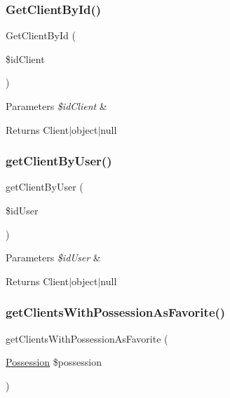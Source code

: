 \subsubsection{\texorpdfstring{GetClientById()}{GetClientById()}}
{\footnotesize\ttfamily Get\+Client\+By\+Id (\begin{DoxyParamCaption}\item[{}]{\$id\+Client }\end{DoxyParamCaption})}


\begin{DoxyParams}{Parameters}
{\em \$id\+Client} & \\
\hline
\end{DoxyParams}
\begin{DoxyReturn}{Returns}
Client$\vert$object$\vert$null 
\end{DoxyReturn}
\mbox{\label{class_app_1_1_b_l_1_1_client_manager_a8fd0a8928e20a9c8b64c3f76746ead77}} 
\subsubsection{\texorpdfstring{getClientByUser()}{getClientByUser()}}
{\footnotesize\ttfamily get\+Client\+By\+User (\begin{DoxyParamCaption}\item[{}]{\$id\+User }\end{DoxyParamCaption})}


\begin{DoxyParams}{Parameters}
{\em \$id\+User} & \\
\hline
\end{DoxyParams}
\begin{DoxyReturn}{Returns}
Client$\vert$object$\vert$null 
\end{DoxyReturn}
\mbox{\label{class_app_1_1_b_l_1_1_client_manager_a04d532b0b319982ca22034751805bd54}} 
\subsubsection{\texorpdfstring{getClientsWithPossessionAsFavorite()}{getClientsWithPossessionAsFavorite()}}
{\footnotesize\ttfamily get\+Clients\+With\+Possession\+As\+Favorite (\begin{DoxyParamCaption}\item[{\mbox{\hyperlink{class_app_1_1_entity_1_1_possession}{Possession}}}]{\$possession }\end{DoxyParamCaption})}


